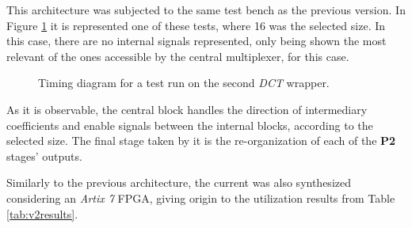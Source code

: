 This architecture was subjected to the same test bench as the previous version. In Figure \ref{fig:v2timing} it is represented one of these tests, where 16 was the selected size. In this case, there are no internal signals represented, only being shown the most relevant of the ones accessible by the central multiplexer, for this case. 

\begin{figure}[!htbp]
    \centering
    
    \caption{Timing diagram for a test run on the second \emph{DCT} wrapper.}
    \label{fig:v2timing}
\end{figure}

As it is observable, the central block handles the direction of intermediary coefficients and enable signals between the internal blocks, according to the selected size. The final stage taken by it is the re-organization of each of the \textbf{P2} stages' outputs.%


Similarly to the previous architecture, the current was also synthesized considering an \emph{Artix 7} FPGA, giving origin to the utilization results from Table \ref{tab:v2results}.

